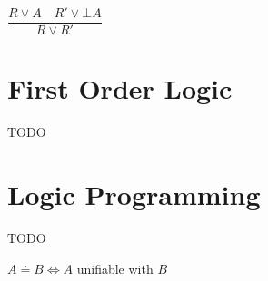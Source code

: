\documentclass[]{article}
\begin{document}

\noindent $\dfrac{R \lor A \hspace{1em} R' \lor \bot A}{R \lor R'}$

\section{First Order Logic}

TODO

\section{Logic Programming}

TODO

$ A \doteq B \Leftrightarrow A $ unifiable with $ B $
\end{document}
